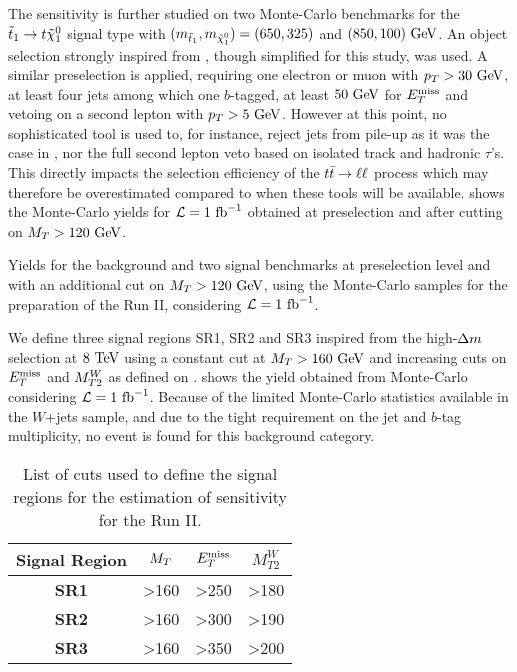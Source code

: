     The sensitivity is further studied on two Monte-Carlo benchmarks for the
    $\tilde{t}_1 \rightarrow t \tilde{\chi}_1^0$ signal type with $(m_{\tilde{t}_1},
    m_{\tilde{\chi}_1^0}) = (650,325)$ and $(850,100)~\text{GeV}$. An object selection
    strongly inspired from , though simplified
    for this study, was used. A similar preselection is applied, requiring one electron
    or muon with $p_T > 30~\text{GeV}$, at least four jets among which one $b$-tagged, at least
    $50~\text{GeV}$ for $E_T^\text{miss}$ and vetoing on a second lepton with $p_T > 5~\text{GeV}$. However
    at this point, no sophisticated tool is used to, for instance, reject jets from
    pile-up as it was the case in , nor the full second
    lepton veto based on isolated track and hadronic $\tau$'s. This directly impacts
    the selection efficiency of the $t\bar{t} \rightarrow \ell \ell$ process which may therefore be
    overestimated compared to when these tools will be available.
     shows the Monte-Carlo yields for $\mathcal{L} = 1~\text{fb}^{-1}$
    obtained at preselection and after cutting on $M_T > 120~\text{GeV}$.

    \begin{table}[h!]
        \centering
        
        \caption{Yields for the background and two signal benchmarks at
        preselection level and with an additional cut on $M_T > 120~\text{GeV}$,
        using the Monte-Carlo samples for the preparation of the Run II, considering
        $\mathcal{L} = 1~\text{fb}^{-1}$. \label{tab:phys14Preselection}}
    \end{table}

    We define three signal regions SR1, SR2 and SR3 inspired from the high-$\Delta m$
    selection at $8~\text{TeV}$ using a constant cut at $M_T > 160~\text{GeV}$ and increasing
    cuts on $E_T^\text{miss}$ and $M_{T2}^W$ as defined on .
     shows the yield obtained from Monte-Carlo considering
    $\mathcal{L} = 1~\text{fb}^{-1}$. Because of the limited Monte-Carlo statistics available
    in the $W$+jets sample, and due to the tight requirement on the jet and $b$-tag
    multiplicity, no event is found for this background category.

    \begin{table}[h!]
        \centering
        \begin{tabular}{|c|ccc|}
            \hline
            \textbf{Signal Region} & $M_T$ & $E_T^\text{miss}$ & $M_{T2}^W$ \\
            \hline
            \textbf{SR1}           & >160  & >250 & >180 \\
            \textbf{SR2}           & >160  & >300 & >190 \\
            \textbf{SR3}           & >160  & >350 & >200 \\
            \hline
        \end{tabular}
        \caption{List of cuts used to define the signal regions for the estimation of
        sensitivity for the Run II. \label{tab:phys14Cuts}}
    \end{table}


